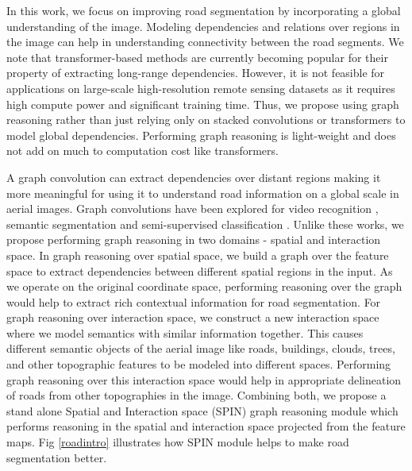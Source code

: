 \documentclass[letterpaper, 10 pt, conference]{ieeeconf}
\begin{document}
In this work, we focus on improving road segmentation by incorporating a global understanding of the image. Modeling dependencies and relations over regions in the image can help in understanding connectivity between the road segments. We note that transformer-based methods \cite{dosovitskiy2020image} are currently becoming popular for their property of extracting long-range dependencies. However, it is not feasible for applications on large-scale high-resolution remote sensing  datasets as it requires high compute power and significant training time. Thus, we propose using graph reasoning rather than just relying only on stacked convolutions or transformers to model global dependencies. Performing graph reasoning is light-weight and does not add on much to computation cost like transformers. 

A graph convolution \cite{kipf2016semi} can extract dependencies over distant regions making it more meaningful for using  it to understand road information on a global scale in aerial images. Graph convolutions have been explored for  video recognition \cite{wang2018videos}, semantic segmentation \cite{chen2019graph} and semi-supervised classification \cite{kipf2016semi}. Unlike these works, we propose performing graph reasoning in two domains - spatial and interaction space. In graph reasoning over spatial space, we build a graph over the feature space to extract dependencies between different spatial regions in the input. As we operate on the original coordinate space, performing reasoning over the graph would help to extract rich contextual information for road segmentation. For graph reasoning over interaction space, we construct a new interaction space where we model semantics with similar information together. This causes different semantic objects of the aerial image like roads, buildings, clouds, trees, and other topographic features to be modeled into different spaces. Performing graph reasoning over this interaction space would help in appropriate delineation of roads from other topographies in the image. Combining both, we propose a stand alone Spatial and Interaction space (SPIN) graph reasoning module which performs reasoning in the spatial and interaction space projected from the feature maps. Fig \ref{roadintro} illustrates how SPIN module helps to make road segmentation better. 
\end{document}
